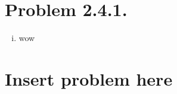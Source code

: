 

\DeclareSIUnit{}





\pagebreak

\section*{Problem 2.4.1.}

\begin{enumerate}[(i)]
    \item wow
\end{enumerate}

\section*{Insert problem here}


